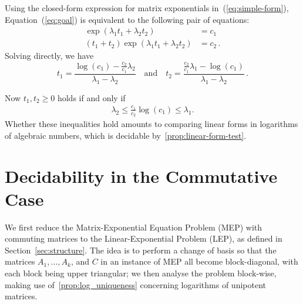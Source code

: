 \documentclass[format=acmsmall, review=false, screen=true]{acmart}
\begin{document}
Using the closed-form expression for matrix exponentials
in~(\ref{eq:simple-form}), Equation~(\ref{eq:goal}) is equivalent to
the following pair of equations:
\begin{align*}
\exp(\lambda_{1} t_{1} + \lambda_{2} t_{2}) &= c_{1} \\
(t_{1} + t_{2}) \exp(\lambda_{1} t_{1} + \lambda_{2} t_{2}) &= c_{2} \, .
\end{align*}
Solving directly, we have
\[ t_{1} = \frac{\log(c_{1}) - \frac{c_{2}}{c_{1}} \lambda_{2}}{\lambda_{1} - \lambda_{2}} \quad\text{and}\quad
t_{2} = \frac{\frac{c_{2}}{c_{1}} \lambda_{1} - \log(c_{1})}{\lambda_{1} - \lambda_{2}}
\, . \]

Now  $t_{1}, t_{2} \geq 0$ holds if and only if
\begin{align*}
\lambda_{2} \leq \frac{c_{1}}{c_{2}} \log(c_{1}) \leq \lambda_{1} .
\end{align*}
Whether these inequalities hold amounts to comparing linear forms in
logarithms of algebraic numbers, which is decidable
by~\cref{prop:linear-form-test}.

\section{Decidability in the Commutative Case}
\label{sec:lics_decidability}

We first reduce the Matrix-Exponential Equation Problem (MEP) with
commuting matrices to the Linear-Exponential Problem (LEP), as defined
in Section~\ref{sec:structure}. The idea is to perform a change of
basis so that the matrices $A_{1}, \ldots, A_{k}$, and $C$ in an
instance of MEP all become block-diagonal, with each block being upper
triangular; we then analyse the problem block-wise, making use
of~\cref{prop:log_uniqueness} concerning logarithms of unipotent
matrices.
\end{document}
